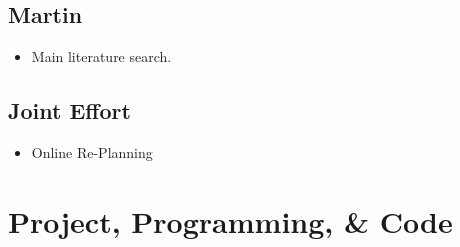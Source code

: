 \documentclass[10pt,a4paper]{article}
\begin{document}
	\subsection{Martin}
		\begin{itemize}	
			\item Main literature search.
		\end{itemize}
			
	\subsection{Joint Effort}
		\begin{itemize}
			\item Online Re-Planning
		\end{itemize}

\section{Project, Programming, \& Code}
\end{document}
